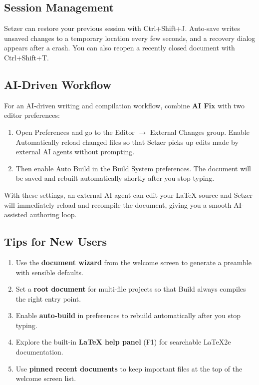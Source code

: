 \documentclass[11pt]{article}
\newcommand{\menu}[1]{\textsf{#1}}
\theoremstyle{definition}
\theoremstyle{plain}
\begin{document}
\subsection{Session Management}
\label{sec:setzer:session}

Setzer can restore your previous session with
\menu{Ctrl+Shift+J}.
Auto-save writes unsaved changes to a temporary location every few
seconds, and a recovery dialog appears after a crash.
You can also reopen a recently closed document with
\menu{Ctrl+Shift+T}.

\subsection{AI-Driven Workflow}
\label{sec:setzer:ai-workflow}

For an AI-driven writing and compilation workflow, combine
\textbf{AI Fix} with two editor preferences:
\begin{enumerate}[noitemsep]
    \item Open \menu{Preferences} and go to the
          \menu{Editor $\rightarrow$ External Changes} group.
          Enable \menu{Automatically reload changed files} so that
          Setzer picks up edits made by external AI agents without
          prompting.
    \item Then enable \menu{Auto Build} in the
          \menu{Build System} preferences.
          The document will be saved and rebuilt automatically
          shortly after you stop typing.
\end{enumerate}
With these settings, an external AI agent can edit your \LaTeX{}
source and Setzer will immediately reload and recompile the
document, giving you a smooth AI-assisted authoring loop.

\subsection{Tips for New Users}
\label{sec:setzer:tips}

\begin{enumerate}[noitemsep]
    \item Use the \textbf{document wizard} from the welcome screen to
          generate a preamble with sensible defaults.
    \item Set a \textbf{root document} for multi-file projects so that
          \menu{Build} always compiles the right entry point.
    \item Enable \textbf{auto-build} in preferences to rebuild
          automatically after you stop typing.
    \item Explore the built-in \textbf{LaTeX help panel} (F1) for
          searchable LaTeX2e documentation.
    \item Use \textbf{pinned recent documents} to keep important files
          at the top of the welcome screen list.
\end{enumerate}
\end{document}
